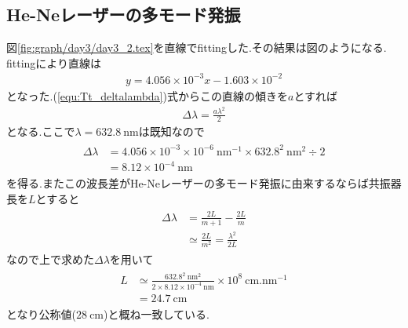 \subsection{He-Neレーザーの多モード発振}
図\ref{fig:graph/day3/day3_2.tex}を直線でfittingした.その結果は図のようになる.
fittingにより直線は
\begin{align}
  y=4.056\times10^{-3}x-1.603\times10^{-2}
\end{align}
となった.(\ref{equ:Tt_deltalambda})式からこの直線の傾きを$a$とすれば
\begin{align}
  \Delta\lambda=\frac{a\lambda^2}{2}
\end{align}
となる.ここで$\lambda=632.8\ \si{\nano\metre}$は既知なので
\begin{align}
  \begin{split}
    \Delta\lambda&=4.056\times10^{-3}\times10^{-6}\ \si{\nano\metre^{-1}}\times632.8^2\ \si{\nano\metre^2}\div 2\\
    &=8.12\times10^{-4}\ \si{\nano\metre}
  \end{split}
\end{align}
を得る.またこの波長差がHe-Neレーザーの多モード発振に由来するならば共振器長を$L$とすると
\begin{align}
  \begin{split}
    \Delta\lambda&=\frac{2L}{m+1}-\frac{2L}{m}\\
    &\simeq\frac{2L}{m^2}=\frac{\lambda^2}{2L}
  \end{split}
\end{align}
なので上で求めた$\Delta\lambda$を用いて
\begin{align}
  \begin{split}
    L&\simeq\frac{632.8^2\ \si{\nano\metre^2}}{2\times8.12\times10^{-4}\ \si{\nano\metre}}\times10^8\ \si{\centi\metre.\nano\metre^{-1}}\\
    &=24.7\ \si{\centi\metre}
  \end{split}
\end{align}
となり公称値($28\ \si{\centi\metre}$)と概ね一致している.
